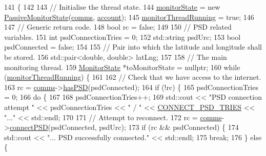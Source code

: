 \begin{DoxyCode}
141 \{
142 
143     \textcolor{comment}{// Initialise the thread state.}
144     \hyperlink{class_monitor_a56b40e06ac7f2f36520e82ee01a17d4c}{monitorState} = \textcolor{keyword}{new} \hyperlink{class_passive_monitor_state}{PassiveMonitorState}(\hyperlink{class_monitor_a42fffadeba33ae6080b1d95783ca703b}{comms}, 
      \hyperlink{class_monitor_acacff99178fbcd9eae50801acc346bf4}{account});
145     \hyperlink{class_monitor_a63d26dffb146b9cfd0705163f3dc4745}{monitorThreadRunning} = \textcolor{keyword}{true};
146 
147     \textcolor{comment}{// Generic return code.}
148     \textcolor{keywordtype}{bool} rc = \textcolor{keyword}{false};
149 
150     \textcolor{comment}{// PSD related variables.}
151     \textcolor{keywordtype}{int} psdConnectionTries = 0;
152     std::string psdUrc;
153     \textcolor{keywordtype}{bool} psdConnected = \textcolor{keyword}{false};
154 
155     \textcolor{comment}{// Pair into which the latitude and longitude shall be stored.}
156     std::pair<double, double> latLng;
157 
158     \textcolor{comment}{// The main monitoring thread.}
159     \hyperlink{class_monitor_state}{MonitorState} *toMonitorState = \textcolor{keyword}{nullptr};
160     \textcolor{keywordflow}{while} (\hyperlink{class_monitor_a63d26dffb146b9cfd0705163f3dc4745}{monitorThreadRunning}) \{
161 
162         \textcolor{comment}{// Check that we have access to the internet.}
163         rc = \hyperlink{class_monitor_a42fffadeba33ae6080b1d95783ca703b}{comms}->\hyperlink{class_comms_a2c43ce409b48f4d28eefb7934cdd1523}{hasPSD}(psdConnected);
164         \textcolor{keywordflow}{if} (!rc) \{
165             psdConnectionTries = 0;
166             \textcolor{keywordflow}{do} \{
167 
168                 psdConnectionTries++;
169                 std::cout << \textcolor{stringliteral}{"PSD connection attempt "} << psdConnectionTries << \textcolor{stringliteral}{" / "} << 
      \hyperlink{_monitor_8cpp_af5cf22b2d85959f36b7e007da57eaf37}{CONNECT\_PSD\_TRIES} << \textcolor{stringliteral}{"..."} << std::endl;
170 
171                 \textcolor{comment}{// Attempt to reconnect.}
172                 rc = \hyperlink{class_monitor_a42fffadeba33ae6080b1d95783ca703b}{comms}->\hyperlink{class_comms_a6d720b51b543ec05b140efdde4cca824}{connectPSD}(psdConnected, psdUrc);
173                 \textcolor{keywordflow}{if} (rc && psdConnected) \{
174                     std::cout << \textcolor{stringliteral}{"... PSD successfully connected."} << std::endl;
175                     \textcolor{keywordflow}{break};
176                 \} \textcolor{keywordflow}{else} \{

\end{DoxyCode}

